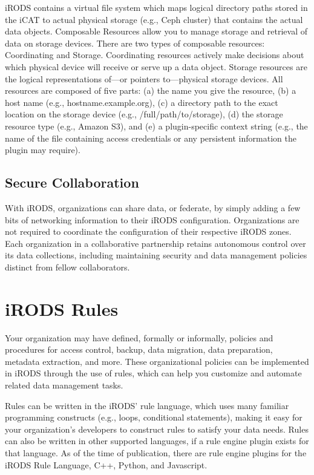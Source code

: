 \documentclass[10pt,oneside]{memoir}
\begin{document}
iRODS contains a virtual file system which maps logical directory paths stored in the iCAT to actual physical storage (e.g., Ceph cluster) that contains the actual data objects. Composable Resources allow you to manage storage and retrieval of data on storage devices. There are two types of composable resources: Coordinating and Storage. Coordinating resources actively make decisions about which physical device will receive or serve up a data object. Storage resources are the logical representations of---or pointers to---physical storage devices. All resources are composed of five parts: (a) the name you give the resource, (b) a host name (e.g., hostname.example.org), (c) a directory path to the exact location on the storage device (e.g., /full/path/to/storage), (d) the storage resource type (e.g., Amazon S3), and (e) a plugin-specific context string (e.g., the name of the file containing access credentials or any persistent information the plugin may require).

\subsection{Secure Collaboration}

With iRODS, organizations can share data, or federate, by simply adding a few bits of networking information to their iRODS configuration. Organizations are not required to coordinate the configuration of their respective iRODS zones. Each organization in a collaborative partnership retains autonomous control over its data collections, including maintaining security and data management policies distinct from fellow collaborators.

\section{iRODS Rules}

Your organization may have defined, formally or informally, policies and procedures for access control, backup, data migration, data preparation, metadata extraction, and more. These organizational policies can be implemented in iRODS through the use of rules, which can help you customize and automate related data management tasks.

Rules can be written in the iRODS' rule language, which uses many familiar programming constructs (e.g., loops, conditional statements), making it easy for your organization's developers to construct rules to satisfy your data needs.  Rules can also be written in other supported languages, if a rule engine plugin exists for that language.  As of the time of publication, there are rule engine plugins for the iRODS Rule Language, C++, Python, and Javascript.
\end{document}
